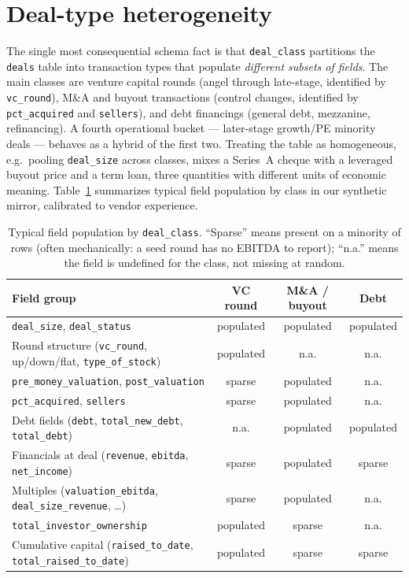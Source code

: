 \section{Deal-type heterogeneity}
\label{sec:data-dealtypes}

The single most consequential schema fact is that \texttt{deal\_class} partitions the
\texttt{deals} table into transaction types that populate \emph{different subsets of
fields}. The main classes are venture capital rounds (angel through late-stage,
identified by \texttt{vc\_round}), M\&A and buyout transactions (control changes,
identified by \texttt{pct\_acquired} and \texttt{sellers}), and debt financings (general
debt, mezzanine, refinancing). A fourth operational bucket --- later-stage growth/PE
minority deals --- behaves as a hybrid of the first two. Treating the table as
homogeneous, e.g.\ pooling \texttt{deal\_size} across classes, mixes a Series~A cheque
with a leveraged buyout price and a term loan, three quantities with different units of
economic meaning. Table~\ref{tab:data-classfields} summarizes typical field population by
class in our synthetic mirror, calibrated to vendor experience.

\begin{table}[htbp]
\centering
\small
\begin{tabular}{p{5.6cm}ccc}
\toprule
Field group & VC round & M\&A / buyout & Debt \\
\midrule
\texttt{deal\_size}, \texttt{deal\_status}          & populated & populated & populated \\
Round structure (\texttt{vc\_round}, up/down/flat,
  \texttt{type\_of\_stock})                          & populated & n.a.      & n.a. \\
\texttt{pre\_money\_valuation}, \texttt{post\_valuation} & sparse & populated & n.a. \\
\texttt{pct\_acquired}, \texttt{sellers}             & sparse    & populated & n.a. \\
Debt fields (\texttt{debt}, \texttt{total\_new\_debt},
  \texttt{total\_debt})                              & n.a.      & populated & populated \\
Financials at deal (\texttt{revenue}, \texttt{ebitda},
  \texttt{net\_income})                              & sparse    & populated & sparse \\
Multiples (\texttt{valuation\_ebitda},
  \texttt{deal\_size\_revenue}, \dots)               & sparse    & populated & n.a. \\
\texttt{total\_investor\_ownership}                  & populated & sparse    & n.a. \\
Cumulative capital (\texttt{raised\_to\_date},
  \texttt{total\_raised\_to\_date})                  & populated & sparse    & sparse \\
\bottomrule
\end{tabular}
\caption{Typical field population by \texttt{deal\_class}. ``Sparse'' means present on a
minority of rows (often mechanically: a seed round has no EBITDA to report); ``n.a.''
means the field is undefined for the class, not missing at random.}
\label{tab:data-classfields}
\end{table}

